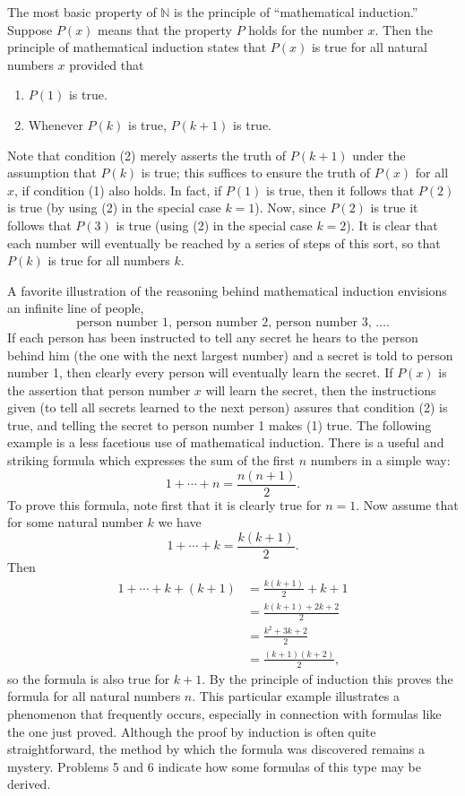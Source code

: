 The most basic property of $\mathbb{N}$ is the principle of ``mathematical
induction.'' Suppose $P(x)$ means that the property $P$ holds for the number
$x$. Then the principle of mathematical induction states that $P(x)$ is true
for all natural numbers $x$ provided that

\begin{enumerate}[label=(\arabic*),leftmargin=2.6em,itemsep=0pt,topsep=2pt]
\item $P(1)$ is true.
\item Whenever $P(k)$ is true, $P(k+1)$ is true.
\end{enumerate}

Note that condition (2) merely asserts the truth of $P(k+1)$ under the
assumption that $P(k)$ is true; this suffices to ensure the truth of $P(x)$
for all $x$, if condition (1) also holds. In fact, if $P(1)$ is true, then it
follows that $P(2)$ is true (by using (2) in the special case $k = 1$). Now,
since $P(2)$ is true it follows that $P(3)$ is true (using (2) in the special
case $k = 2$). It is clear that each number will eventually be reached by a
series of steps of this sort, so that $P(k)$ is true for all numbers $k$.

A favorite illustration of the reasoning behind mathematical induction
envisions an infinite line of people,
\[ \text{person number 1, person number 2, person number 3, } \dots . \]
If each person has been instructed to tell any secret he hears to the person
behind him (the one with the next largest number) and a secret is told to
person number 1, then clearly every person will eventually learn the secret.
If $P(x)$ is the assertion that person number $x$ will learn the secret, then
the instructions given (to tell all secrets learned to the next person)
assures that condition (2) is true, and telling the secret to person number 1
makes (1) true. The following example is a less facetious use of mathematical
induction. There is a useful and striking formula which expresses the sum of
the first $n$ numbers in a simple way:
\[
1 + \cdots + n = \frac{n(n+1)}{2}.
\]
To prove this formula, note first that it is clearly true for $n = 1$. Now
assume that for some natural number $k$ we have
\[
1 + \cdots + k = \frac{k(k+1)}{2}.
\]
Then
\begin{align*}
1 + \cdots + k + (k+1) &= \frac{k(k+1)}{2} + k + 1\\
&= \frac{k(k+1) + 2k + 2}{2}\\
&= \frac{k^2 + 3k + 2}{2}\\
&= \frac{(k+1)(k+2)}{2},
\end{align*}
so the formula is also true for $k + 1$. By the principle of induction this
proves the formula for all natural numbers $n$. This particular example
illustrates a phenomenon that frequently occurs, especially in connection
with formulas like the one just proved. Although the proof by induction is
often quite straightforward, the method by which the formula was discovered
remains a mystery. Problems 5 and 6 indicate how some formulas of this type
may be derived.

